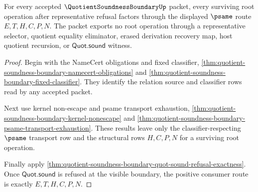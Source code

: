 \begin{theorem}
\label{thm:quotient-soundness-boundary-root-psame-route-totality}
For every accepted $\QuotientSoundnessBoundaryUp$ packet, every surviving root operation after representative refusal factors through the displayed $\psame$ route $E,T,H,C,P,N$. The packet exports no root operation through a representative selector, quotient equality eliminator, erased derivation recovery map, host quotient recursion, or $\mathsf{Quot.sound}$ witness.
\end{theorem}
\begin{proof}
Begin with the NameCert obligations and fixed classifier, \autoref{thm:quotient-soundness-boundary-namecert-obligations} and \autoref{thm:quotient-soundness-boundary-fixed-classifier}. They identify the relation source and classifier rows read by any accepted packet.

Next use kernel non-escape and psame transport exhaustion, \autoref{thm:quotient-soundness-boundary-kernel-nonescape} and \autoref{thm:quotient-soundness-boundary-psame-transport-exhaustion}. These results leave only the classifier-respecting $\psame$ transport row and the structural rows $H,C,P,N$ for a surviving root operation.

Finally apply \autoref{thm:quotient-soundness-boundary-quot-sound-refusal-exactness}. Once $\mathsf{Quot.sound}$ is refused at the visible boundary, the positive consumer route is exactly $E,T,H,C,P,N$.
\end{proof}

